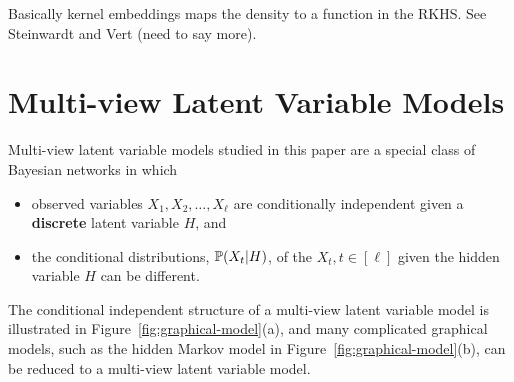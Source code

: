 \documentclass{article}
\begin{document}
 Basically kernel embeddings maps the density to a function in the RKHS. See Steinwardt and Vert (need to say more).


\section{Multi-view Latent Variable Models}

Multi-view latent variable models studied in this paper are a
special class of Bayesian networks in which
\begin{itemize}[noitemsep,nolistsep]
  \item observed variables $X_1, X_2, \ldots, X_\ell$ are conditionally independent given a {\bf discrete} latent variable $H$, and
	\item the conditional distributions, $\mathbb{P}(X_t|H)$, of the $X_t, t \in [\ell]$ given the hidden variable $H$ can be different.
\end{itemize}
The conditional independent structure of a multi-view latent variable model is illustrated in Figure~\ref{fig:graphical-model}(a), and many complicated graphical models, such as the hidden Markov model in Figure~\ref{fig:graphical-model}(b), can be reduced to a multi-view latent variable model.
\end{document}
